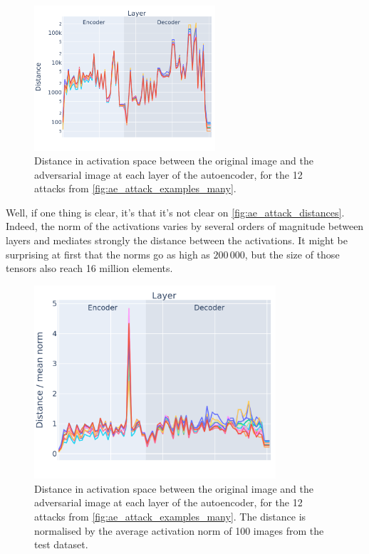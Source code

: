 \documentclass[]{scrarticle}
\begin{document}
\begin{figure}[h]
  \centering
  \includegraphics[width=0.6\textwidth]{../images/ae_attack_distances.png}
  \caption{
    Distance in activation space between the original image and the adversarial image
    at each layer of the autoencoder, for the 12 attacks from
    \autoref{fig:ae_attack_examples_many}.
  }
  \label{fig:ae_attack_distances}
\end{figure}

Well, if one thing is clear, it's that it's not clear on \autoref{fig:ae_attack_distances}.
Indeed, the norm of the activations varies by several orders of magnitude
between layers and mediates strongly the distance between the activations.
It might be surprising at first that the norms go as high as $200\,000$,
but the size of those tensors also reach 16 million elements.

\begin{figure}[H]
  \centering
  \includegraphics[width=0.8\textwidth]{../images/ae_attack_distances_normalized.png}
  \caption{
    Distance in activation space between the original image and the adversarial image
    at each layer of the autoencoder, for the 12 attacks from
    \autoref{fig:ae_attack_examples_many}.
    The distance is normalised by the average activation norm of 100 images
    from the test dataset.
  }
  \label{fig:ae_attack_distances_normalized}
\end{figure}
\end{document}
